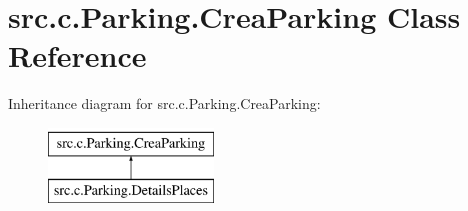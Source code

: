 \hypertarget{classsrc_1_1c_1_1_parking_1_1_crea_parking}{}\section{src.\+c.\+Parking.\+Crea\+Parking Class Reference}
\label{classsrc_1_1c_1_1_parking_1_1_crea_parking}
Inheritance diagram for src.\+c.\+Parking.\+Crea\+Parking\+:\begin{figure}[H]
\begin{center}
\leavevmode
\includegraphics[height=2.000000cm]{classsrc_1_1c_1_1_parking_1_1_crea_parking}
\end{center}
\end{figure}

